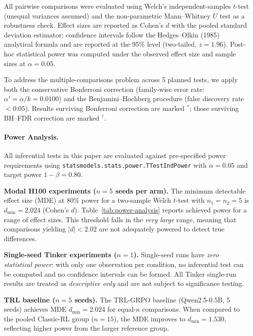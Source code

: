 \documentclass{article}  \usepackage[preprint,nonatbib]{neurips_2026} \usepackage[numbers]{natbib}
\begin{document}
All pairwise comparisons were evaluated using Welch's independent-samples $t$-test
(unequal variances assumed) and the non-parametric Mann--Whitney $U$ test as a
robustness check. Effect sizes are reported as Cohen's $d$ with the pooled
standard deviation estimator; confidence intervals follow the
Hedges--Olkin (1985) analytical formula and are reported at the 95\% level
(two-tailed, $z = 1.96$). Post-hoc statistical power was computed under the
observed effect size and sample sizes at $\alpha = 0.05$.

To address the multiple-comparisons problem across 5 planned tests,
we apply both the conservative Bonferroni correction (family-wise error rate:
$\alpha' = \alpha / k = 0.0100$) and the Benjamini--Hochberg procedure
(false discovery rate $< 0.05$). Results surviving Bonferroni correction are
marked $^*$; those surviving BH--FDR correction are marked $^\dag$.

\paragraph{Power Analysis.}
All inferential tests in this paper are evaluated against pre-specified power
requirements using \texttt{statsmodels.stats.power.TTestIndPower} with
$\alpha = 0.05$ and target power $1 - \beta = 0.80$.

\textbf{Modal H100 experiments ($n = 5$ seeds per arm).}
The minimum detectable effect size (MDE) at 80\% power for a two-sample
Welch $t$-test with $n_1 = n_2 = 5$ is
$d_{\min} = 2.024$ (Cohen's $d$).
Table~\ref{tab:power-analysis} reports achieved power for a range of effect sizes.
This threshold falls in the \emph{very large} range, meaning that
comparisons yielding $|d| < 2.02$
are not adequately powered to detect true differences.

\textbf{Single-seed Tinker experiments ($n = 1$).}
Single-seed runs have \emph{zero statistical power}: with only one observation per
condition, no inferential test can be computed and no confidence intervals can be
formed.  All Tinker single-run results are treated as \emph{descriptive only} and
are not subject to significance testing.

\textbf{TRL baseline ($n = 5$ seeds).}
The TRL-GRPO baseline (Qwen2.5-0.5B, 5 seeds) achieves MDE
$d_{\min} = 2.024$ for equal-$n$ comparisons.
When compared to the pooled Classic-RL group ($n = 15$), the MDE
improves to $d_{\min} = 1.530$,
reflecting higher power from the larger reference group.
\end{document}
